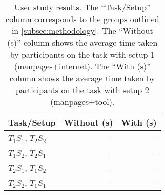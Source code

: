 \begin{table}
    \begin{center}
    \begin{tabular}{lrr}
        \textbf{Task/Setup} & \textbf{Without (s)} & \textbf{With (s)} \\
        \hline
        $T_1 S_1$, $T_2 S_2$ & - & - \\
        $T_1 S_2$, $T_2 S_1$ & - & - \\
        $T_2 S_1$, $T_1 S_2$ & - & - \\
        $T_2 S_2$, $T_1 S_1$ & - & - \\
    \end{tabular}
    \end{center}
    \caption{User study results. The ``Task/Setup'' column corresponds to the
        groups outlined in \autoref{subsec:methodology}. The ``Without (s)''
        column shows the average time taken by participants on the task with
        setup 1 (manpages+internet). The ``With (s)'' column shows the average
        time taken by participants on the task with setup 2 (manpages+tool).}
\end{table}

